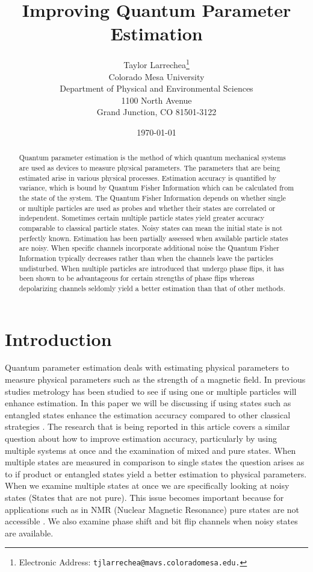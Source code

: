 \documentclass[twocolumn]{article}
\title{\textbf{Improving Quantum Parameter Estimation}}
\author{Taylor Larrechea\footnote{Electronic Address: \texttt{tjlarrechea@mavs.coloradomesa.edu.}} \\
    Colorado Mesa University \\
    Department of Physical and Environmental Sciences \\
    1100 North Avenue \\
    Grand Junction, CO 81501-3122}
\date{\today}
\begin{document}
\maketitle
\begin{abstract}
Quantum parameter estimation is the method of which quantum mechanical systems are used as devices to measure physical parameters. The parameters that are being estimated arise in various physical processes. Estimation accuracy is quantified by variance, which is bound by Quantum Fisher Information which can be calculated from the state of the system. The Quantum Fisher Information depends on whether single or multiple particles are used as probes and whether their states are correlated or independent. Sometimes certain multiple particle states yield greater accuracy comparable to classical particle states. Noisy states can mean the initial state is not perfectly known. Estimation has been partially assessed when available particle states are noisy. When specific channels incorporate additional noise the Quantum Fisher Information typically decreases rather than when the channels leave the particles undisturbed. When multiple particles are introduced that undergo phase flips, it has been shown to be advantageous for certain strengths of phase flips whereas depolarizing channels seldomly yield a better estimation than that of other methods.
\end{abstract}
\section*{Introduction}
Quantum parameter estimation deals with estimating physical parameters to measure physical parameters such as the strength of a magnetic field. In previous studies metrology has been studied to see if using one or multiple particles will enhance estimation. In this paper we will be discussing if using states such as entangled states enhance the estimation accuracy compared to other classical strategies \cite{Braunstein,Caves,Helstrom,Sarovar}. The research that is being reported in this article covers a similar question about how to improve estimation accuracy, particularly by using multiple systems at once and the examination of mixed and pure states. When multiple states are measured in comparison to single states the question arises as to if product or entangled states yield a better estimation to physical parameters. When we examine multiple states at once we are specifically looking at noisy states (States that are not pure). This issue becomes important because for applications such as in NMR (Nuclear Magnetic Resonance) pure states are not accessible \cite{D. Collins}. We also examine phase shift and bit flip channels when noisy states are available.
\end{document}
